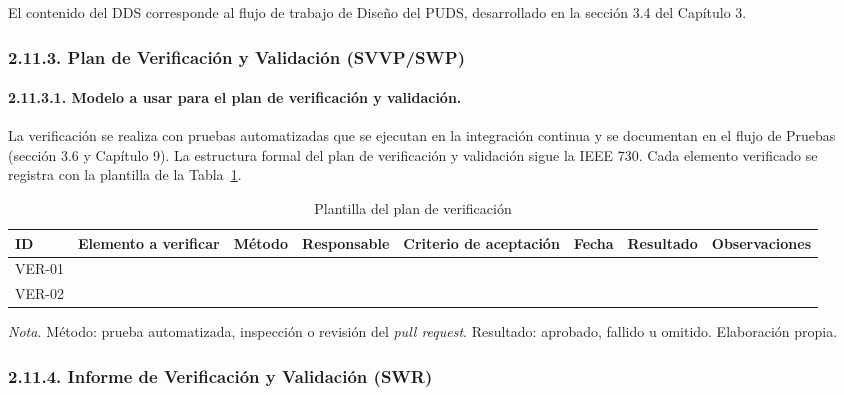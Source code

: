 El contenido del DDS corresponde al flujo de trabajo de Diseño del PUDS, desarrollado en la sección 3.4 del Capítulo 3.

\subsubsection{2.11.3. Plan de Verificación y Validación (SVVP/SWP)}

\paragraph{2.11.3.1. Modelo a usar para el plan de verificación y validación.}

La verificación se realiza con pruebas automatizadas que se ejecutan en la integración continua y se documentan en el flujo de Pruebas (sección 3.6 y Capítulo 9). La estructura formal del plan de verificación y validación sigue la IEEE 730. Cada elemento verificado se registra con la plantilla de la Tabla~\ref{tab:plantilla_verificacion}.

\begin{table}[H]
\caption{Plantilla del plan de verificación}
\label{tab:plantilla_verificacion}
\begin{threeparttable}
\begin{tabular}{>{\raggedright\arraybackslash}p{1.2cm} >{\raggedright\arraybackslash}p{2.2cm} >{\raggedright\arraybackslash}p{1.8cm} >{\raggedright\arraybackslash}p{1.9cm} >{\raggedright\arraybackslash}p{2.2cm} >{\raggedright\arraybackslash}p{1.3cm} >{\raggedright\arraybackslash}p{1.4cm} >{\raggedright\arraybackslash}p{1.8cm}}
\toprule
ID & Elemento a verificar & Método & Responsable & Criterio de aceptación & Fecha & Resultado & Observaciones \\
\midrule
VER-01 & & & & & & & \\
VER-02 & & & & & & & \\
\bottomrule
\end{tabular}
\begin{tablenotes}[flushleft]
\small
\item \textit{Nota.} Método: prueba automatizada, inspección o revisión del \textit{pull request}. Resultado: aprobado, fallido u omitido. Elaboración propia.
\end{tablenotes}
\end{threeparttable}
\end{table}

\subsubsection{2.11.4. Informe de Verificación y Validación (SWR)}

